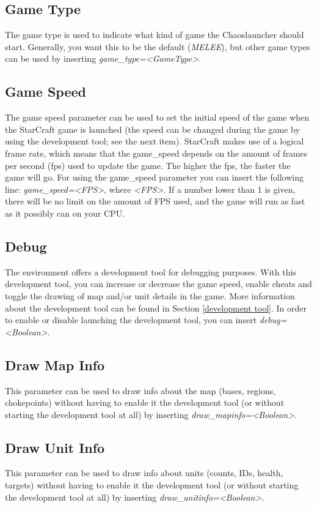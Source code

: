 \subsection{Game Type}
\label{game type}
The game type is used to indicate what kind of game the Chaoslauncher should start. Generally, you want this to be the default (\textit{MELEE}), but other game types can be used by inserting \textit{game\_type=<GameType>}.

\subsection{Game Speed}
\label{game speed}
The game speed parameter can be used to set the initial speed of the game when the StarCraft game is launched (the speed can be changed during the game by using the development tool; see the next item). StarCraft makes use of a logical frame rate, which means that the game\_speed depends on the amount of frames per second (fps) used to update the game. The higher the fps, the faster the game will go. For using the game\_speed parameter you can insert the following line: \textit{game\_speed=<FPS>}, where \textit{<FPS>}. If a number lower than 1 is given, there will be no limit on the amount of FPS used, and the game will run as fast as it possibly can on your CPU.

\pagebreak
\subsection{Debug}
\label{debug}
The environment offers a development tool for debugging purposes. With this development tool, you can increase or decrease the game speed, enable cheats and toggle the drawing of map and/or unit details in the game. More information about the development tool can be found in Section \ref{development tool}. In order to enable or disable launching the development tool, you can insert \textit{debug=<Boolean>}.

\subsection{Draw Map Info}
\label{draw map info}
This parameter can be used to draw info about the map (bases, regions, chokepoints) without having to enable it the development tool (or without starting the development tool at all) by inserting \textit{draw\_mapinfo=<Boolean>}.

\subsection{Draw Unit Info}
\label{draw unit info}
This parameter can be used to draw info about units (counts, IDs, health, targets) without having to enable it the development tool (or without starting the development tool at all) by inserting \textit{draw\_unitinfo=<Boolean>}.

